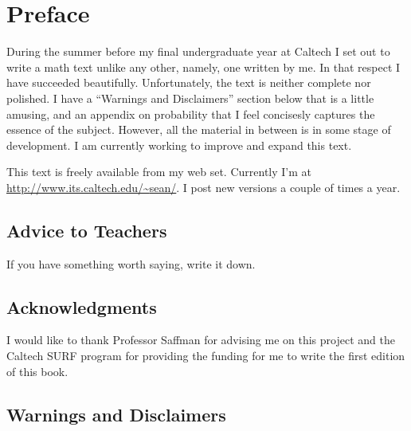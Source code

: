 
\chapter{Preface}

During the summer before my final undergraduate year at Caltech I set
out to write a math text unlike any other, namely, one written by me.
In that respect I have succeeded beautifully.  Unfortunately, the text is
neither complete nor polished.  I have a ``Warnings and Disclaimers''
section below that is a little amusing, and an appendix on probability that 
I feel concisesly captures the essence of the subject.
However, all the material in between is in some stage of development.  
I am currently working to improve and expand this text.

This text is freely available from my web set.  Currently I'm at
\href{http://www.its.caltech.edu/~sean/}
        {http://www.its.caltech.edu/{\~{}}sean/}.
I post new versions a couple of times a year.





\section{Advice to Teachers}

If you have something worth saying, write it down.







\section{Acknowledgments}

I would like to thank Professor Saffman for advising me on
this project and the Caltech SURF program for providing
the funding for me to write the first edition of this book.




\section{Warnings and Disclaimers}

